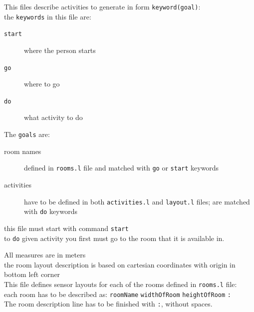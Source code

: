 \documentclass[12pt, a4paper, pdflatex, leqno, twoside, openright]{report}
\begin{document}
% 

This files describe activities to generate in form \texttt{keyword(goal)}:\\
% 

the \texttt{keywords} in this file are:\\
\begin{description}
\item[\texttt{start}] where the person starts
\item[\texttt{go}] where to go
\item[\texttt{do}] what activity to do
\end{description}

The \texttt{goals} are:
\begin{description}
\item[room names] defined in \texttt{rooms.l} file and matched with \texttt{go} or \texttt{start} keywords

\item[activities] have to be defined in both \texttt{activities.l} and \texttt{layout.l} files; are matched with \texttt{do} keywords
\end{description}


this file must start with command \texttt{start}\\
to \texttt{do} given activity you first must go to the room that it is available in.

All measures are in meters\\
the room layout description is based on cartesian coordinates with origin in bottom left corner\\

This file defines sensor layouts for each of the rooms defined in \texttt{rooms.l} file:\\
% 

each room has to be described as:
\texttt{roomName} \texttt{widthOfRoom} \texttt{heightOfRoom} \texttt{:}\\
The room description line has to be finished with \texttt{:}, without spaces.\\
\end{document}
